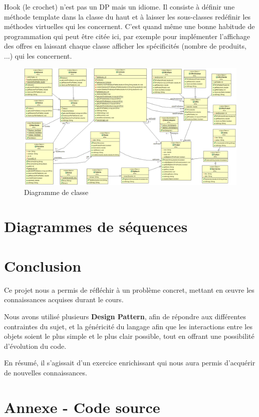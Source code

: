 \documentclass{article}
\begin{document}
{
Hook (le crochet) n'est pas un DP mais un idiome. Il consiste à définir une méthode template dans
la classe du haut et à laisser les sous-classes redéfinir les méthodes virtuelles qui les
concernent. C'est quand même une bonne habitude de programmation qui peut être citée ici,
par exemple pour implémenter l'affichage des offres en laissant chaque classe afficher les
spécificités (nombre de produits, ...) qui les concernent.
}

\begin{figure}
	\vfill\hfill %
	\includegraphics[scale=0.36]{diagUML.png}
	\hfill\vfill %
	\caption{Diagramme de classe}
\end{figure}

\clearpage %

\section*{Diagrammes de séquences}

\clearpage %

\vfill
\section*{Conclusion}

Ce projet nous a permis de réfléchir à un problème concret, mettant en œuvre les connaissances acquises durant le cours.
\par
Nous avons utilisé plusieurs \textbf{Design Pattern}, afin de répondre aux différentes contraintes du sujet,
et la généricité du langage afin que les interactions entre les objets soient le plus simple et le plus clair possible, tout en offrant une possibilité d'évolution du code.
\par
En résumé, il s'agissait d'un exercice enrichissant qui nous aura permis d'acquérir de nouvelles connaissances.

 \clearpage
 
\section*{Annexe - Code source}

%
\end{document}
